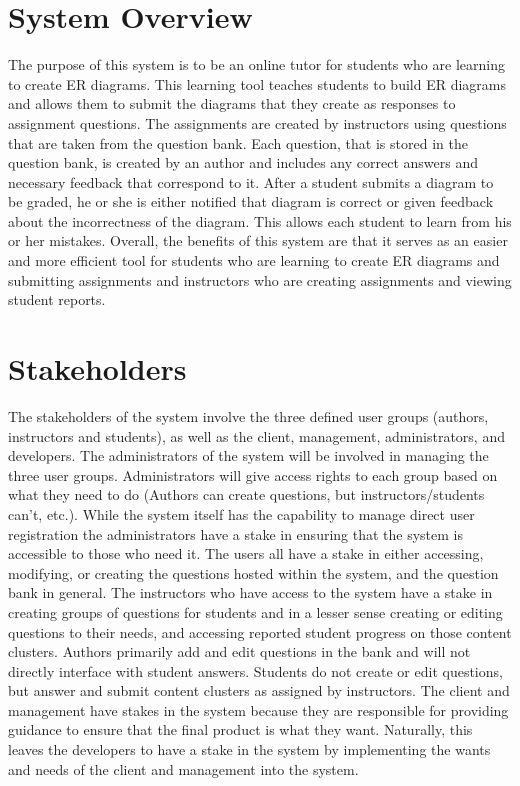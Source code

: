 \chapter {System Overview}

The purpose of this system is to be an online tutor for students who are learning to create ER diagrams. This learning tool teaches students to build ER diagrams and allows them to submit the diagrams that they create as responses to assignment questions. The assignments are created by instructors using questions that are taken from the question bank. Each question, that is stored in 
the question bank, is created by an author and includes any correct answers and necessary feedback that correspond to it. After a student submits a diagram to be graded, he or she is either notified that diagram is correct or given feedback about the incorrectness of the diagram. This allows each student to learn from his or her mistakes. Overall, the benefits of this system are that it serves as an easier and more efficient tool for students who are learning to create ER diagrams and submitting assignments and instructors who are creating assignments and viewing student reports.  

\chapter{Stakeholders}
The stakeholders of the system involve the three defined user groups (authors, instructors and students), as well as the client, management, administrators, and developers. The administrators of the system will be involved in managing the three user groups. Administrators will give access rights to each group based on what they need to do (Authors can create questions, but instructors/students can’t, etc.). While the system itself has the capability to manage direct user registration the administrators have a stake in ensuring that the system is accessible to those who need it. The users all have a stake in either accessing, modifying, or creating the questions hosted within the system, and the question bank in general. The instructors who have access to the system have a stake in creating groups of questions for students and in a lesser sense creating or editing questions to their needs, and accessing reported student progress on those content clusters. Authors primarily add and edit questions in the bank and will not directly interface with student answers. Students do not create or edit questions, but answer and submit content clusters as assigned by instructors. The client and management have stakes in the system because they are responsible for providing guidance to ensure that the final product is what they want. Naturally, this leaves the developers to have a stake in the system by implementing the wants and needs of the client and management into the system.


